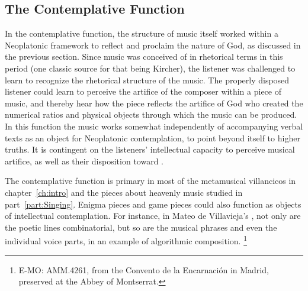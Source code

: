 \subsection{The Contemplative Function}

In the contemplative function, the structure of music itself worked within a Neoplatonic framework to reflect and proclaim the nature of God, as discussed in the previous section.
Since music was conceived of in rhetorical terms in this period (one classic source for that being Kircher), the listener was challenged to learn to recognize the rhetorical structure of the music.
The properly disposed listener could learn to perceive the artifice of the composer within a piece of music, and thereby hear how the piece reflects the artifice of God who created the numerical ratios and physical objects through which the music can be produced.
In this function the music works somewhat independently of accompanying verbal texts as an object for Neoplatonic contemplation, to point beyond itself to higher truths.
It is contingent on the listeners' intellectual capacity to perceive musical artifice, as well as their disposition toward .

The contemplative function is primary in most of the metamusical villancicos in chapter~\ref{ch:intro} and the pieces about heavenly music studied in part~\ref{part:Singing}.
Enigma pieces and game pieces could also function as objects of intellectual contemplation.
For instance, in Mateo de Villavieja's , not only are the poetic lines combinatorial, but so are the musical phrases and even the individual voice parts, in an example of algorithmic composition.%
	\footnote{%
	E-MO: AMM.4261, from the Convento de la Encarnación in Madrid, preserved at the Abbey of Montserrat.
	}

